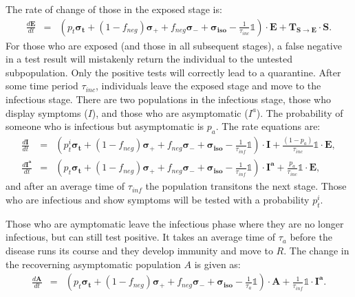\documentclass[notitlepage, superscriptaddress]{revtex4-2}
\begin{document}
The rate of change of those in the exposed stage is:
\begin{eqnarray} 
\frac{d \boldsymbol{E}}{dt} &=& \left( p_{t} \boldsymbol{\sigma_{t}} + (1-f_{neg}) \boldsymbol{\sigma_{+}} + f_{neg} \boldsymbol{\sigma_{-}} + \boldsymbol{\sigma_{iso}} - \frac{1}{\tau_{inc}} \mathbb{1} \right) \cdot \boldsymbol{E} + \boldsymbol{T_{S \rightarrow E}} \cdot \boldsymbol{S}. 
\end{eqnarray}
For those who are exposed (and those in all subsequent stages), a false negative in a test result will mistakenly return the individual to the untested subpopulation. Only the positive tests will correctly lead to a quarantine. After some time period $\tau_{inc}$, individuals leave the exposed stage and move to the infectious stage. There are two populations in the infectious stage, those who display symptoms ($I$), and those who are asymptomatic ($I^{a}$). The probability of someone who is infectious but asymptomatic is $p_{a}$. The rate equations are:
\begin{eqnarray}
\frac{d \boldsymbol{I}}{dt} &=& \left( p^{i}_{t} \boldsymbol{\sigma_{t}} + (1-f_{neg}) \boldsymbol{\sigma_{+}} + f_{neg} \boldsymbol{\sigma_{-}} + \boldsymbol{\sigma_{iso}} - \frac{1}{\tau_{inf}} \mathbb{1} \right) \cdot \boldsymbol{I} + \frac{(1-p_{a})}{\tau_{inc}} \mathbb{1} \cdot \boldsymbol{E}, \\ 
%
\frac{d \boldsymbol{I^{a}}}{dt} &=& \left( p_{t} \boldsymbol{\sigma_{t}} + (1-f_{neg}) \boldsymbol{\sigma_{+}} + f_{neg} \boldsymbol{\sigma_{-}} + \boldsymbol{\sigma_{iso}} - \frac{1}{\tau_{inf}} \mathbb{1} \right) \cdot \boldsymbol{I^{a}} + \frac{p_{a}}{\tau_{inc}} \mathbb{1} \cdot \boldsymbol{E},
\end{eqnarray}
and after an average time of $\tau_{inf}$ the population transitons the next stage. Those who are infectious and show symptoms will be tested with a probability $p^{i}_{t}$.

Those who are aymptomatic leave the infectious phase where they are no longer infectious, but can still test positive. It takes an average time of $\tau_{a}$ before the disease runs its course and they develop immunity and move to $R$. The change in the recoverning asymptomatic population $A$ is given as:
\begin{eqnarray}
\frac{d \boldsymbol{A}}{dt} &=& \left( p_{t} \boldsymbol{\sigma_{t}} + (1-f_{neg}) \boldsymbol{\sigma_{+}} + f_{neg} \boldsymbol{\sigma_{-}} + \boldsymbol{\sigma_{iso}} - \frac{1}{\tau_{a}} \mathbb{1} \right) \cdot \boldsymbol{A} + \frac{1}{\tau_{inf}} \mathbb{1} \cdot \boldsymbol{I^{a}}. \\ 
\end{eqnarray}
\end{document}
